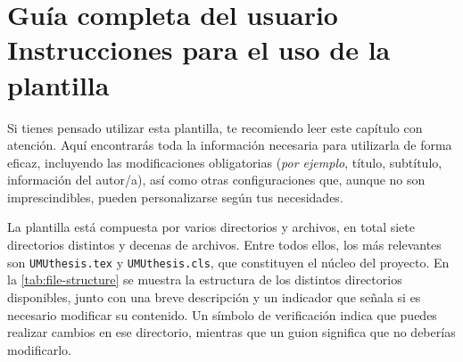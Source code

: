 \chapter[Guía completa del usuario: Instrucciones para el uso de la plantilla]{Guía completa del usuario Instrucciones para el uso de la plantilla}
\label{cp:user-guide}

{
\parindent0pt

Si tienes pensado utilizar esta plantilla, te recomiendo leer este capítulo con atención. Aquí encontrarás toda la información necesaria para utilizarla de forma eficaz, incluyendo las modificaciones obligatorias (\textit{por ejemplo}, título, subtítulo, información del autor/a), así como otras configuraciones que, aunque no son imprescindibles, pueden personalizarse según tus necesidades.

La plantilla está compuesta por varios directorios y archivos, en total siete directorios distintos y decenas de archivos. Entre todos ellos, los más relevantes son \texttt{UMUthesis.tex} y \texttt{UMUthesis.cls}, que constituyen el núcleo del proyecto. En la \autoref{tab:file-structure} se muestra la estructura de los distintos directorios disponibles, junto con una breve descripción y un indicador que señala si es necesario modificar su contenido. Un símbolo de verificación indica que puedes realizar cambios en ese directorio, mientras que un guion significa que no deberías modificarlo.

}
